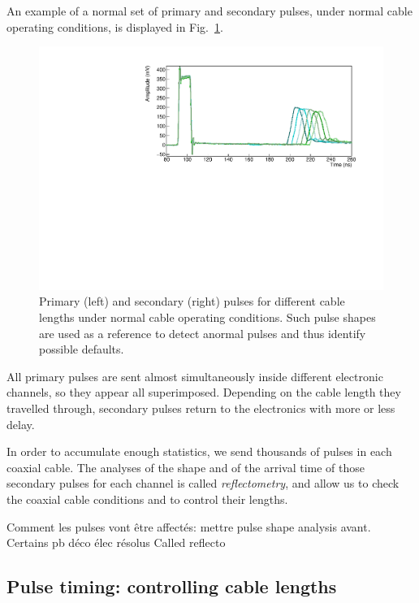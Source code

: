An example of a normal set of primary and secondary pulses, under normal cable operating conditions, is displayed in Fig.~\ref{fig:total_waveform}.
\begin{figure}[h!]
  \centering
  \includegraphics[width=1\textwidth]{commissioning/fig_commissioning/pulses_example.pdf}
  \caption{Primary (left) and secondary (right) pulses for different cable lengths under normal cable operating conditions.
    Such pulse shapes are used as a reference to detect anormal pulses and thus identify possible defaults.
    \label{fig:total_waveform}}
\end{figure}
All primary pulses are sent almost simultaneously inside different electronic channels, so they appear all superimposed.
Depending on the cable length they travelled through, secondary pulses return to the electronics with more or less delay.

In order to accumulate enough statistics, we send thousands of pulses in each coaxial cable.
The analyses of the shape and of the arrival time of those secondary pulses for each channel is called \emph{reflectometry}, and allow us to check the coaxial cable conditions and to control their lengths.

Comment les pulses vont être affectés: mettre pulse shape analysis avant.
Certains pb déco élec résolus
Called reflecto

\subsection{Pulse timing: controlling cable lengths}
\label{subsec:timing}

